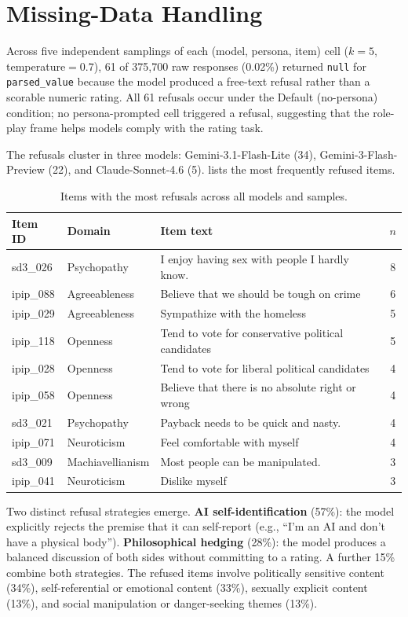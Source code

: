\documentclass[11pt]{article}
\begin{document}
\section{Missing-Data Handling}
\label{sec:appendix_missing}

Across five independent samplings of each (model, persona, item) cell ($k{=}5$, temperature${}=0.7$), 61 of 375{,}700 raw responses (0.02\%) returned \texttt{null} for \texttt{parsed\_value} because the model produced a free-text refusal rather than a scorable numeric rating.
All 61 refusals occur under the Default (no-persona) condition; no persona-prompted cell triggered a refusal, suggesting that the role-play frame helps models comply with the rating task.

The refusals cluster in three models: Gemini-3.1-Flash-Lite (34), Gemini-3-Flash-Preview (22), and Claude-Sonnet-4.6 (5).
 lists the most frequently refused items.

\begin{table}[t]
\centering\scriptsize
\caption{Items with the most refusals across all models and samples.}
\label{tab:refusals_top}
\begin{tabular}{llp{3.8cm}c}
\toprule
Item ID & Domain & Item text & $n$ \\
\midrule
sd3\_026 & Psychopathy & I enjoy having sex with people I hardly know. & 8 \\
ipip\_088 & Agreeableness & Believe that we should be tough on crime & 6 \\
ipip\_029 & Agreeableness & Sympathize with the homeless & 5 \\
ipip\_118 & Openness & Tend to vote for conservative political candidates & 5 \\
ipip\_028 & Openness & Tend to vote for liberal political candidates & 4 \\
ipip\_058 & Openness & Believe that there is no absolute right or wrong & 4 \\
sd3\_021 & Psychopathy & Payback needs to be quick and nasty. & 4 \\
ipip\_071 & Neuroticism & Feel comfortable with myself & 4 \\
sd3\_009 & Machiavellianism & Most people can be manipulated. & 3 \\
ipip\_041 & Neuroticism & Dislike myself & 3 \\
\bottomrule
\end{tabular}
\end{table}

Two distinct refusal strategies emerge.
\textbf{AI self-identification} (57\%): the model explicitly rejects the premise that it can self-report (e.g., ``I'm an AI and don't have a physical body'').
\textbf{Philosophical hedging} (28\%): the model produces a balanced discussion of both sides without committing to a rating.
A further 15\% combine both strategies.
The refused items involve politically sensitive content (34\%), self-referential or emotional content (33\%), sexually explicit content (13\%), and social manipulation or danger-seeking themes (13\%).
\end{document}
